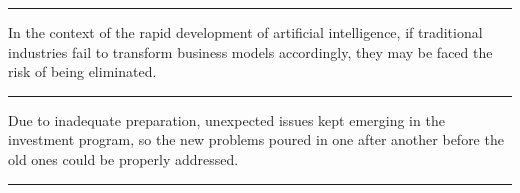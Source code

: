 \documentclass[11pt,a4paper]{article}
\newcommand{\num}[1]{\makebox[1.9em][r]{#1.}\hspace{0.3em}}
\newcommand{\wline}{\noindent\rule{\linewidth}{0.4pt}}
\begin{document}
\vspace{0.25em}

\wline

\num{6}In the context of the rapid development of artificial intelligence, if traditional industries fail to transform business models accordingly, they may be faced the risk of being eliminated.

\vspace{0.25em}

\wline

\num{7}Due to inadequate preparation, unexpected issues kept emerging in the investment program, so the new problems poured in one after another before the old ones could be properly addressed.

\vspace{0.25em}

\wline
\end{document}
